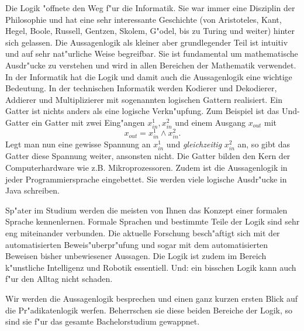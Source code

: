 Die Logik "offnete den Weg f"ur die Informatik. Sie war immer eine Disziplin der Philosophie und hat eine sehr interessante Geschichte (von Aristoteles, Kant, Hegel, Boole, Russell, Gentzen, Skolem, G"odel, bis zu Turing und weiter) hinter sich gelassen. Die Aussagenlogik als kleiner aber grundlegender Teil ist intuitiv und auf sehr nat"urliche Weise begreifbar. Sie ist fundamental um mathematische Ausdr"ucke zu verstehen und wird in allen Bereichen der Mathematik verwendet. In der Informatik hat die Logik und damit auch die Aussagenlogik eine wichtige Bedeutung. In der technischen Informatik werden Kodierer und Dekodierer, Addierer und Multiplizierer mit sogenannten logischen Gattern realisiert. Ein Gatter ist nichts anders als eine logische Verkn"upfung. Zum Beispiel ist das Und-Gatter ein Gatter mit zwei Eing"angen $x_{in}^1, x_{in}^2$ und einem Ausgang $x_{out}$ mit 
\begin{equation*}
	x_{out} = x_{in}^1 \land x_{in}^2.
\end{equation*}
Legt man nun eine gewisse Spannung an $x_{in}^1$ und \textit{gleichzeitig} $x_{in}^2$ an, so gibt das Gatter diese Spannung weiter, ansonsten nicht. Die Gatter bilden den Kern der Computerhardware wie z.B. Mikroprozessoren. Zudem ist die Aussagenlogik in jeder Programmiersprache eingebettet. Sie werden viele logische Ausdr"ucke in Java schreiben.

Sp"ater im Studium werden die meisten von Ihnen das Konzept einer formalen Sprache kennenlernen. Formale Sprachen und bestimmte Teile der Logik sind sehr eng miteinander verbunden. Die aktuelle Forschung besch"aftigt sich mit der automatisierten Beweis"uberpr"ufung und sogar mit dem automatisierten Beweisen bisher unbewiesener Aussagen. Die Logik ist zudem im Bereich k"unstliche Intelligenz und Robotik essentiell. Und: ein bisschen Logik kann auch f"ur den Alltag nicht schaden.

Wir werden die Aussagenlogik besprechen und einen ganz kurzen ersten Blick auf die Pr"adikatenlogik werfen. Beherrschen sie diese beiden Bereiche der Logik, so sind sie f"ur das gesamte Bachelorstudium gewappnet.


